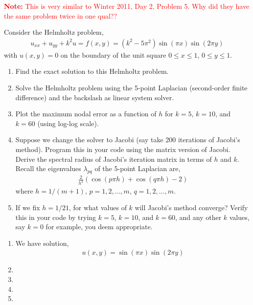 \documentclass[10pt]{article}
\newcommand{\note}[1]{\textcolor{red}{\textbf{Note:} #1}}
\begin{document}
\begin{problem}
\note{This is very similar to Winter 2011, Day 2, Problem 5. Why did they have the same problem twice in one qual??}
    
    Consider the Helmholtz problem,
\begin{align*}
    u_{xx} + u_{yy} + k^2u = f(x,y) = (k^2-5\pi^2)\sin(\pi x)\sin(2\pi y)
\end{align*}
    with \( u(x,y) = 0 \) on the boundary of the unit square \( 0\leq x\leq 1 \), \( 0\leq y\leq 1 \).
\begin{enumerate}[nolistsep,label=(\alph*)]
    \item Find the exact solution to this Helmholtz problem.
    \item Solve the Helmholtz problem using the 5-point Laplacian (second-order finite difference) and the backslash as linear system solver.    
    \item Plot the maximum nodal error as a function of \( h \) for \( k=5 \), \( k=10 \), and \( k=60 \) (using log-log scale).
    \item Suppose we change the solver to Jacobi (say take 200 iterations of Jacobi’s method). Program this in your code using the matrix
        version of Jacobi. Derive the spectral radius of Jacobi’s iteration matrix in terms of \( h \) and \( k \). Recall the eigenvalues \( \lambda_{pq} \) of the 5-point Laplacian are,
        \begin{align*}
            \frac{2}{h^2} (\cos(p\pi h)+\cos(q \pi h)-2)
        \end{align*}
        where \( h=1/(m+1) \), \( p=1,2,\ldots,m \), \( q=1,2,\ldots,m \).
    \item If we fix \( h = 1/21 \), for what values of \( k \) will Jacobi’s method converge? Verify this in your code by trying \( k = 5 \), \( k = 10 \), and \( k = 60 \), and any other \( k \) values, say \( k = 0 \) for example, you deem appropriate.
\end{enumerate}

\end{problem}

\begin{solution}[Solution]
\begin{enumerate}[label=(\alph*)]
    \item We have solution,
        \begin{align*}
            u(x,y) = \sin(\pi x)\sin(2\pi y)
        \end{align*} 
    \item 
    \item 
    \item 
    \item 
\end{enumerate}
 
\end{solution}
\end{document}

